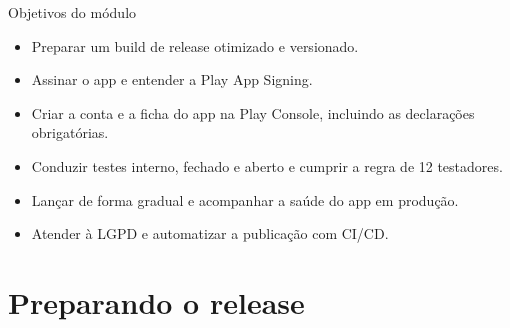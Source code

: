 \documentclass[aspectratio=169,10pt]{beamer}
\begin{document}
\capa

\begin{frame}{Objetivos do módulo}
  \begin{conceito}
    \begin{itemize}
      \item Preparar um build de release otimizado e versionado.
      \item Assinar o app e entender a Play App Signing.
      \item Criar a conta e a ficha do app na Play Console, incluindo as declarações obrigatórias.
      \item Conduzir testes interno, fechado e aberto e cumprir a regra de 12 testadores.
      \item Lançar de forma gradual e acompanhar a saúde do app em produção.
      \item Atender à LGPD e automatizar a publicação com CI/CD.
    \end{itemize}
  \end{conceito}
\end{frame}

\sumario

\section{Preparando o release}
\end{document}
